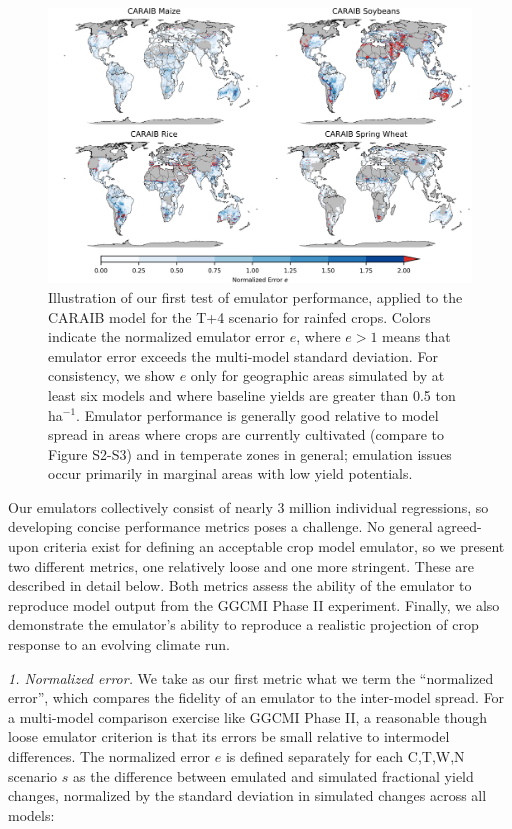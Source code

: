 \documentclass[gmd, manuscript]{copernicus} %
\begin{document}
\begin{figure}[ht]
\centering
    \includegraphics[width=16.3cm]{figures/CARAIB_spatial_error.png}
    \caption{
    Illustration of our first test of emulator performance, applied to the CARAIB model for the T+4 scenario for rainfed crops. 
    Colors indicate the normalized emulator error $e$, where $e > 1$ means that emulator error exceeds the multi-model standard deviation. 
    For consistency, we show $e$ only for geographic areas simulated by at least six models and where baseline yields are greater than 0.5 ton ha$^{-1}$.
    Emulator performance is generally good relative to model spread in areas where crops are currently cultivated (compare to Figure S2-S3) and in temperate zones in general; emulation issues occur primarily in marginal areas with low yield potentials. 
    }
   \label{fig:error}
\end{figure}

Our emulators collectively consist of nearly 3 million individual regressions, so developing concise performance metrics poses a challenge.
No general agreed-upon criteria exist for defining an acceptable crop model emulator, so we present two different metrics, one relatively loose and one more stringent. 
These are described in detail below. Both metrics assess the ability of the emulator to reproduce model output from the GGCMI Phase II experiment. 
Finally, we also demonstrate the emulator's ability to reproduce a realistic projection of crop response to an evolving climate run. 

\smallskip
\textit{1. Normalized error.} We take as our first metric what we term the ``normalized error'', which compares the fidelity of an emulator to the inter-model spread. 
For a multi-model comparison exercise like GGCMI Phase II, a reasonable though loose emulator criterion is that its errors be small relative to intermodel differences. The normalized error $e$ is defined separately for each C,T,W,N scenario $s$ as the difference between emulated and simulated fractional yield changes, normalized by the standard deviation in simulated changes across all models: 
\end{document}
